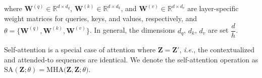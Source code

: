 \noindent where $\bm{W}^{(q)} \in \mathbb{R}^{d \times d_q}$, $\bm{W}^{(k)} \in \mathbb{R}^{d \times d_k}$, and $\bm{W}^{(v)} \in \mathbb{R}^{d \times d_v}$ are layer-specific weight matrices for queries, keys, and values, respectively, and $\theta = \{\bm{W}^{(q)}, \bm{W}^{(k)}, \bm{W}^{(v)}\}$. In general, the dimensions $d_q$, $d_k$, $d_v$ are set $\dfrac{d}{h}$.

Self-attention is a special case of attention where $\bm{Z} = \bm{Z}'$, \textit{i.e.}, the contextualized and attended-to sequences are identical. We denote the self-attention operation as $\textrm{SA}(\bm{Z}; \theta) = \textrm{MHA}\bigl(\bm{Z}, \bm{Z}; \theta\bigr)$.





